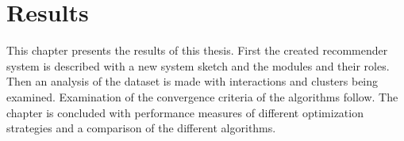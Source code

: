 \chapter{Results}\label{cha:Results}


This chapter presents the results of this thesis. First the created recommender system is described with a new system sketch and the modules and their roles. Then an analysis of the dataset is made with interactions and clusters being examined. Examination of the convergence criteria of the algorithms follow.  The chapter is concluded with performance measures of different optimization strategies and a comparison of the different algorithms.


\newpage


\newpage

